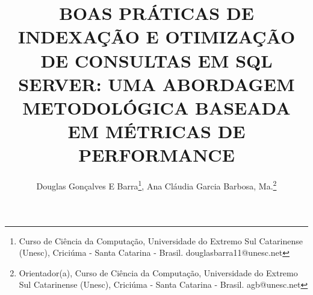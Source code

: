 \documentclass{UNESC}
\title{BOAS PRÁTICAS DE INDEXAÇÃO E OTIMIZAÇÃO DE CONSULTAS EM SQL SERVER: UMA ABORDAGEM METODOLÓGICA BASEADA EM MÉTRICAS DE PERFORMANCE}
\author
{
   Douglas Gonçalves E Barra\footnote{Curso de Ciência da Computação, Universidade do Extremo Sul Catarinense (Unesc), Criciúma - Santa Catarina - Brasil. douglasbarra11@unesc.net},
   Ana Cláudia Garcia Barbosa, Ma.\footnote{Orientador(a), Curso de Ciência da Computação, Universidade do Extremo Sul Catarinense (Unesc), Criciúma - Santa Catarina - Brasil. agb@unesc.net}
}
\begin{document}
\onehalfspacing

\maketitle















\renewcommand{\refname}{REFERÊNCIAS}


\end{document}
